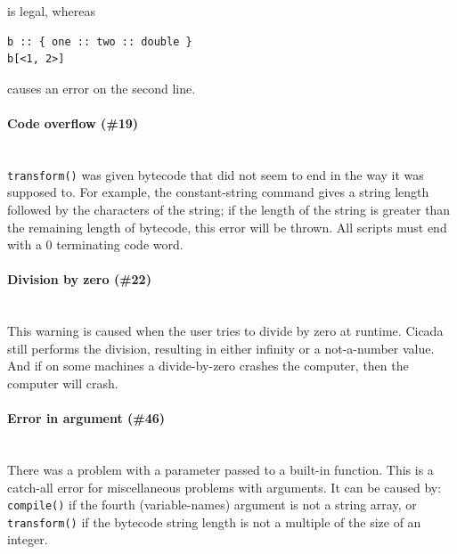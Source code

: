 \documentclass{article}
\newenvironment{code}{
       \begin{list}{}{
               \setlength{\leftmargin}{.4in}
               \setlength{\rightmargin}{0in}
               \setlength{\topsep}{.2in}
       }
       \small
       \item[] }
       { \end{list}   }
\begin{document}
\noindent is legal, whereas

\begin{code} \begin{verbatim}
b :: { one :: two :: double }
b[<1, 2>]
\end{verbatim} \end{code}

\noindent causes an error on the second line.\\




\paragraph{Code overflow (\#19)\\\\}

\verb#transform()# was given bytecode that did not seem to end in the way it was supposed to.  For example, the constant-string command gives a string length followed by the characters of the string; if the length of the string is greater than the remaining length of bytecode, this error will be thrown.  All scripts must end with a 0 terminating code word.\\




\paragraph{Division by zero (\#22)\\\\}

This warning is caused when the user tries to divide by zero at runtime.  Cicada still performs the division, resulting in either infinity or a not-a-number value.  And if on some machines a divide-by-zero crashes the computer, then the computer will crash.\\




\paragraph{Error in argument (\#46)\\\\}

There was a problem with a parameter passed to a built-in function.  This is a catch-all error for miscellaneous problems with arguments.  It can be caused by:  \verb#compile()# if the fourth (variable-names) argument is not a string array, or \verb#transform()# if the bytecode string length is not a multiple of the size of an integer.\\
\end{document}
